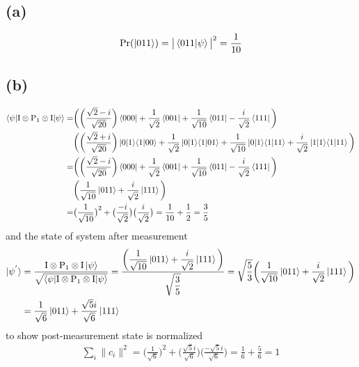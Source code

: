 \documentclass{article}
\newcommand{\op}[2]{|#1\rangle \langle#2|}
\newcommand{\sand}[3]{\braket{#1 | #2 | #3}}
\begin{document}
\subsection*{(a)}
\begin{align*}
    \text{Pr}(\ket{011}) = \big|\braket{011|\psi}\big|^2 = \frac{1}{10}
\end{align*}
\subsection*{(b)}
\begin{align*}
    \sand{\psi}{\text{I} \otimes \text{P}_{1} \otimes \text{I}}{\psi} = &\bigg(\bigg(\frac{\sqrt{2} - i}{\sqrt{20}}\bigg)\bra{000} + \frac{1}{\sqrt{2}}\bra{001} + \frac{1}{\sqrt{10}}\bra{011} - \frac{i}{\sqrt{2}}\bra{111}\bigg) \\
    &\bigg(\bigg(\frac{\sqrt{2} + i}{\sqrt{20}}\bigg)\ket{0\op{1}{1}00} + \frac{1}{\sqrt{2}}\ket{0\op{1}{1}01} + \frac{1}{\sqrt{10}}\ket{0\op{1}{1}11} + \frac{i}{\sqrt{2}}\ket{1\op{1}{1}11}\bigg) \\
    = &\bigg(\bigg(\frac{\sqrt{2} - i}{\sqrt{20}}\bigg)\bra{000} + \frac{1}{\sqrt{2}}\bra{001} + \frac{1}{\sqrt{10}}\bra{011} - \frac{i}{\sqrt{2}}\bra{111}\bigg) \\
    &\bigg(\frac{1}{\sqrt{10}}\ket{011} + \frac{i}{\sqrt{2}}\ket{111}\bigg) \\
    = &\big(\frac{1}{\sqrt{10}}\big)^2 + \big(\frac{-i}{\sqrt{2}}\big)\big(\frac{i}{\sqrt{2}}\big) = \frac{1}{10} + \frac{1}{2} = \frac{3}{5}
 \end{align*}
 and the state of system after measurement
 \begin{align*}
     \ket{\psi^{'}} &= \frac{\text{I} \otimes \text{P}_{1} \otimes \text{I}\ket{\psi}}{\sqrt{ \sand{\psi}{\text{I} \otimes \text{P}_{1} \otimes \text{I}}{\psi}}} = \frac{\displaystyle\bigg(\frac{1}{\sqrt{10}}\ket{011} + \frac{i}{\sqrt{2}}\ket{111}\bigg)}{\displaystyle\sqrt{\frac{3}{5}}}
     = \sqrt{\frac{5}{3}}\bigg(\frac{1}{\sqrt{10}}\ket{011} + \frac{i}{\sqrt{2}}\ket{111}\bigg) \\
     &= \frac{1}{\sqrt{6}}\ket{011} + \frac{\sqrt{5}i}{\sqrt{6}}\ket{111}
 \end{align*}
 to show post-measurement state is normalized
 \begin{align*}
    \sum_i \|c_i\|^2 = \bigg(\frac{1}{\sqrt{6}}\bigg)^2 + \bigg(\frac{\sqrt{5}i}{\sqrt{6}}\bigg)\bigg(\frac{-\sqrt{5}i}{\sqrt{6}}\bigg) = \frac{1}{6} + \frac{5}{6} = 1
 \end{align*}
\end{document}

